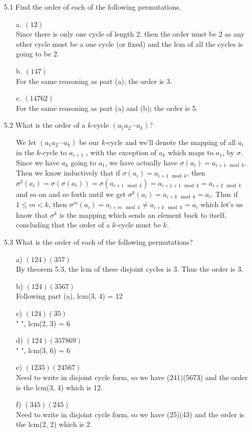 \documentclass[12pt]{article}
\begin{document}
\begin{enumerate}
\item[5.1] Find the order of each of the following permutations.
\begin{enumerate}
\item[a.] $(12)$ \\
Since there is only one cycle of length 2, then the order must be
2 as any other cycle must be a one cycle (or fixed) and the lcm of all the cycles is 
going to be 2.
\item[b.] $(147)$ \\
For the same reasoning as part (a); the order is 3.
\item[c.] $(14762)$ \\
For the same reasoning as part (a) and (b); the order is 5. 
\end{enumerate}

\item[5.2] What is the order of a $k$-cycle $(a_1a_2\cdots a_k)$?
\begin{enumerate}
\item[] We let 
$(a_1a_2 \cdots a_k)$ be our $k$-cycle and we'll denote the mapping
of all $a_i$ in the $k$-cycle to $a_{i+1}$ , with the exception of $a_k$ which
maps to $a_1$, by $\sigma$. Since we have $a_k$ going to $a_1$, we have actually
have $\sigma(a_i) = a_{i + 1 \mod k}$. 
Then we know inductively that if $\sigma(a_i) = a_{i + 1 \mod k}$, then
$\sigma^2(a_i) = \sigma(\sigma(a_i)) = \sigma(a_{i+1 \mod k}) = a_{i + 1 + 1 \mod k} = 
a_{i + 2 \mod k}$ and so on and so forth until we get $\sigma^k(a_i) = a_{i + k \mod k} = a_i$.
Thus if $1 \leq m < k$, then $\sigma^m(a_i) = a_{i + m \mod k} \neq a_{i + k \mod k} = a_i$ which
let's us know that $\sigma^k$ is the mapping which sends an element back to itself, concluding
that the order of a $k$-cycle must be $k$.
\end{enumerate}

\item[5.3] What is the order of each of the following permutations?
\begin{enumerate}
\item[a)] $(124)(357)$ \\
By theorem 5.3, the lcm of these disjoint cycles is 3. Thus the order is 3.
\item[b)] $(124)(3567)$ \\
Following part (a), lcm(3, 4) = 12
\item[c)] $(124)(35)$ \\
" ", lcm(2, 3) = 6
\item[d)] $(124)(357869)$ \\
" ", lcm(3, 6) = 6
\item[e)] $(1235)(24567)$ \\
Need to write in disjoint cycle form, so we have (241)(5673) and
the order is the lcm(3, 4) which is 12.
\item[f)] $(345)(245)$ \\
Need to write in disjoint cycle form, so we have (25)(43) and
the order is the lcm(2, 2) which is 2.
\end{enumerate}


\end{enumerate}
\end{document}
